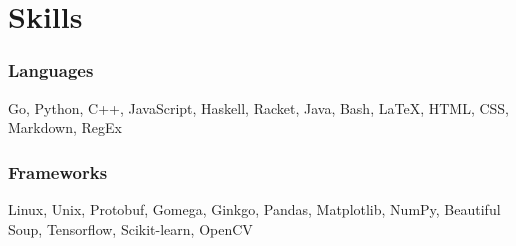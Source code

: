 \documentclass{article}
\makeatletter
\newcommand{\smallbullet}{\,\begin{picture}(-1,1)(-1,-3)\circle*{3}\end{picture}\ }
\newenvironment{resumeItem}
{
    \vspace{0.5em}
}
{
}
\newcommand{\experienceHead}[4]{
    \textbf{#1} @ #2 \hfill #3 \\[-1.2em]
}
\newenvironment{resumeList}
{
    \begin{itemize}[label=\smallbullet]
}
{
    \end{itemize}
}
\makeatother
\begin{document}




\section{Skills}

\begin{resumeItem}
\subsubsection{Languages}
Go, Python, C++, JavaScript, Haskell, Racket, Java, Bash, {\LaTeX}, HTML, CSS, Markdown, RegEx

\subsubsection{Frameworks}
Linux, Unix, Protobuf, Gomega, Ginkgo, Pandas, Matplotlib, NumPy, Beautiful Soup, Tensorflow, Scikit-learn, OpenCV
\end{resumeItem}
\end{document}

